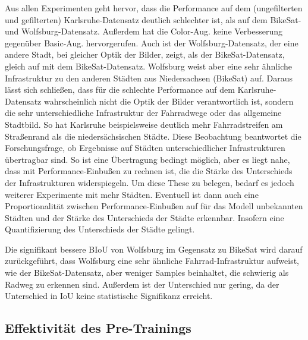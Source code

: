 Aus allen Experimenten geht hervor, dass die Performance auf dem (ungefilterten und gefilterten) Karlsruhe-Datensatz deutlich schlechter ist, 
als auf dem BikeSat- und Wolfsburg-Datensatz. Außerdem hat die Color-Aug. keine Verbesserung gegenüber 
Basic-Aug. hervorgerufen. Auch ist der Wolfsburg-Datensatz, der eine andere Stadt, bei gleicher Optik der Bilder, 
zeigt, als der BikeSat-Datensatz, gleich auf mit dem BikeSat-Datensatz. Wolfsburg weist aber eine sehr ähnliche 
Infrastruktur zu den anderen Städten aus Niedersachsen (BikeSat) auf. Daraus lässt sich schließen, 
dass für die schlechte Performance auf dem Karlsruhe-Datensatz wahrscheinlich nicht die Optik der Bilder verantwortlich 
ist, sondern die sehr unterschiedliche Infrastruktur der Fahrradwege oder das allgemeine Stadtbild. 
So hat Karlsruhe beispielsweise deutlich mehr Fahrradstreifen am Straßenrand als die niedersächsischen Städte. 
Diese Beobachtung beantwortet die Forschungsfrage, ob Ergebnisse auf Städten unterschiedlicher Infrastrukturen 
übertragbar sind. So ist eine Übertragung bedingt möglich, aber es liegt nahe, dass mit Performance-Einbußen zu rechnen ist, 
die die Stärke des Unterschieds der Infrastrukturen widerspiegeln. 
Um diese These zu belegen, bedarf es jedoch weiterer Experimente mit mehr Städten. Eventuell ist dann 
auch eine Proportionalität zwischen Performance-Einbußen auf für das Modell unbekannten Städten und der Stärke 
des Unterschieds der Städte erkennbar. Insofern eine Quantifizierung des Unterschieds der Städte gelingt. 

Die signifikant bessere BIoU von Wolfsburg im Gegensatz zu BikeSat wird darauf zurückgeführt, dass 
Wolfsburg eine sehr ähnliche Fahrrad-Infrastruktur aufweist, wie der BikeSat-Datensatz, aber weniger 
Samples beinhaltet, die schwierig als Radweg zu erkennen sind. Außerdem ist der Unterschied nur gering, 
da der Unterschied in IoU keine statistische Signifikanz erreicht. 


\subsection{Effektivität des Pre-Trainings}

